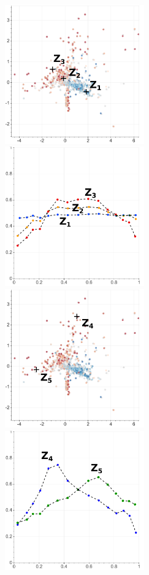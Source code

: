 \begin{figure}
    \centering
    \includegraphics[height=6cm]{img/6_T_Hunch/ls_beta_clip_tcentro_123.png}
    \includegraphics[height=6cm]{img/6_T_Hunch/ls_beta_clip_tcentro_123_g.png}
    \includegraphics[height=6cm]{img/6_T_Hunch/ls_beta_clip_tcentro_45.png}
    \includegraphics[height=6cm]{img/6_T_Hunch/ls_beta_clip_tcentro_45_g.png}

\end{figure}
